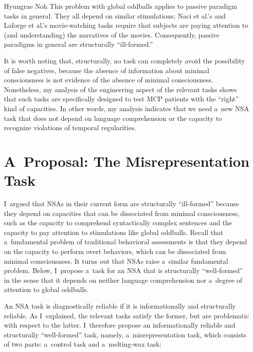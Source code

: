 \begin{artengenv}{Hyungrae Noh}
This problem with global oddballs applies to passive paradigm tasks in general. They all depend on similar stimulations; Naci et al.'s
\parencite*[][]{naci_common_2014} %
 and Laforge et al.'s 
\parencite*[][]{laforge_individualized_2020} %
 movie-watching tasks require that subjects are paying attention to (and understanding) the narratives of the movies. Consequently, passive paradigms in general are structurally ``ill-formed.''

It is worth noting that, structurally, no task can completely avoid the possibility of false negatives, because the absence of information about minimal consciousness is not evidence of the absence of minimal consciousness. Nonetheless, my analysis of the engineering aspect of the relevant tasks shows that such tasks are specifically designed to test MCP patients with the ``right'' kind of capacities. In other words, my analysis indicates that we need a~new NSA task that does not depend on language comprehension or the capacity to recognize violations of temporal regularities.

\section{A~Proposal: The Misrepresentation Task}
I~argued that NSAs in their current form are structurally ``ill-formed'' because they depend on capacities that can be dissociated from minimal consciousness, such as the capacity to comprehend syntactically complex sentences and the capacity to pay attention to stimulations like global oddballs. Recall that a~fundamental problem of traditional behavioral assessments is that they depend on the capacity to perform overt behaviors, which can be dissociated from minimal consciousness. It turns out that NSAs raise a~similar fundamental problem. Below, I~propose a~task for an NSA that is structurally ``well-formed'' in the sense that it depends on neither language comprehension nor a~degree of attention to global oddballs.

An NSA task is diagnostically reliable if it is informationally and structurally reliable. As I~explained, the relevant tasks satisfy the former, but are problematic with respect to the latter. I~therefore propose an informationally reliable and structurally ``well-formed'' task, namely, a~misrepresentation task, which consists of two parts: a~control task and a~melting-wax task:




\end{artengenv}
